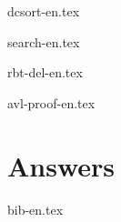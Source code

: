 \documentclass[b5paper,twoside]{book}
\begin{document}
{dcsort-en.tex}

{search-en.tex}

\backmatter

\appendix
\noappendicestocpagenum
\addappheadtotoc

\renewcommand{\thechapter}{\Alph{chapter}}
\renewcommand{\thesection}{\Roman{section}}
\renewcommand{\thesubsection}{\fnsymbol{subsection}}

{rbt-del-en.tex}

{avl-proof-en.tex}


\chapter{Answers}
\shipoutAnswer

{bib-en.tex}



\printindex
\end{document}
